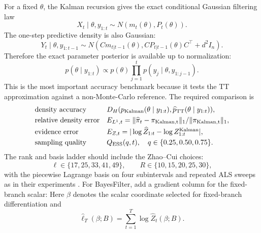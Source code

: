 \documentclass[11pt]{article}
\numberwithin{equation}{section}
\newcommand{\widehatell}{\widehat\ell}
\begin{document}
For a fixed \(\theta\), the Kalman recursion gives the exact conditional
Gaussian filtering law
\begin{equation}
    X_t\mid \theta,y_{1:t}
    \sim
    N(m_t(\theta),P_t(\theta)).
    \label{eq:p27-lg6}
\end{equation}
The one-step predictive density is also Gaussian:
\begin{equation}
    Y_t\mid \theta,y_{1:t-1}
    \sim
    N\!\left(
    C m_{t|t-1}(\theta),
    C P_{t|t-1}(\theta)C^\top+d^2 I_n
    \right).
    \label{eq:p27-lg7}
\end{equation}
Therefore the exact parameter posterior is available up to normalization:
\begin{equation}
    p(\theta\mid y_{1:t})
    \propto
    p(\theta)
    \prod_{j=1}^t
    p(y_j\mid \theta,y_{1:j-1}).
    \label{eq:p27-lg8}
\end{equation}
This is the most important accuracy benchmark because it tests the TT
approximation against a non-Monte-Carlo reference.  The required comparison is
\begin{equation}
\begin{array}{ll}
\text{density accuracy} &
    D_H(p_{\rm Kalman}(\theta\mid y_{1:t}),
        \widehat p_{\rm TT}(\theta\mid y_{1:t})),\\[1mm]
\text{relative density error} &
    E_{L^1,t}
    =
    \|\widehat\pi_t-\pi_{\rm Kalman,t}\|_1/
    \|\pi_{\rm Kalman,t}\|_1,\\[1mm]
\text{evidence error} &
    E_{Z,t}
    =
    |\log\widehat Z_{1:t}-\log Z_{1:t}^{\rm Kalman}|,\\[1mm]
\text{sampling quality} &
    Q_{\rm ESS}(q,t),\quad q\in\{0.25,0.50,0.75\}.
\end{array}
\label{eq:p27-lg9}
\end{equation}
The rank and basis ladder should include the Zhao--Cui choices:
\begin{equation}
    \ell\in\{17,25,33,41,49\},
    \qquad
    R\in\{10,15,20,25,30\},
    \label{eq:p27-lg10}
\end{equation}
with the piecewise Lagrange basis on four subintervals and repeated ALS sweeps
as in their experiments \cite{zhao2024ttsequential}.  For BayesFilter, add a
gradient column for the fixed-branch scalar:
Here \(\beta\) denotes the scalar coordinate selected for fixed-branch
differentiation and
\begin{equation}
    \widehatell_T(\beta;B)
    =
    \sum_{t=1}^T\log\widehat Z_t(\beta;B).
    \label{eq:p27-lg11a}
\end{equation}
\end{document}
